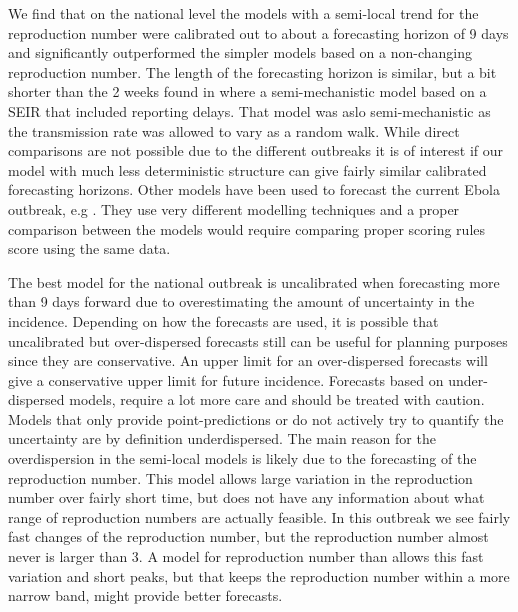 \documentclass[12pt]{article}
\begin{document}
We find that on the national level the models with a semi-local trend for the reproduction number were calibrated out to about a forecasting horizon of 9 days and significantly outperformed the simpler models based on a non-changing reproduction number. The length of the forecasting horizon is similar, but a bit shorter than the 2 weeks found in \cite{funkAssessingPerformanceRealtime2019} where a semi-mechanistic model based on a SEIR that included reporting delays. That model was aslo semi-mechanistic as the transmission rate was allowed to vary as a random walk. While direct comparisons are not possible due to the different outbreaks it is of interest if our model with much less deterministic structure can give fairly similar calibrated forecasting horizons. Other models have been used to forecast the current Ebola outbreak, e.g \cite{kellyRealtimePredictions201820192019, akhmetzhanovAnalyzingForecastingEbola2019}. They use very different modelling techniques and a proper comparison between the models would require comparing proper scoring rules score using the same data. 

The best model for the national outbreak is uncalibrated when forecasting more than 9 days forward due to overestimating the amount of uncertainty in the incidence. Depending on how the forecasts are used, it is possible that uncalibrated but over-dispersed forecasts still can be useful for planning purposes since they are conservative. An upper limit for an over-dispersed forecasts will give a conservative upper limit for future incidence. Forecasts based on under-dispersed models, require a lot more care and should be treated with caution. Models that only provide point-predictions or do not actively try to quantify the uncertainty are by definition underdispersed. The main reason for the overdispersion in the semi-local models is likely due to the forecasting of the reproduction number. This model allows large variation in the reproduction number over fairly short time, but does not have any information about what range of reproduction numbers are actually feasible. In this outbreak we see fairly fast changes of the reproduction number, but the reproduction number almost never is larger than 3. A model for reproduction number than allows this fast variation and short peaks, but that keeps the reproduction number within a more narrow band, might provide better forecasts.
\end{document}
